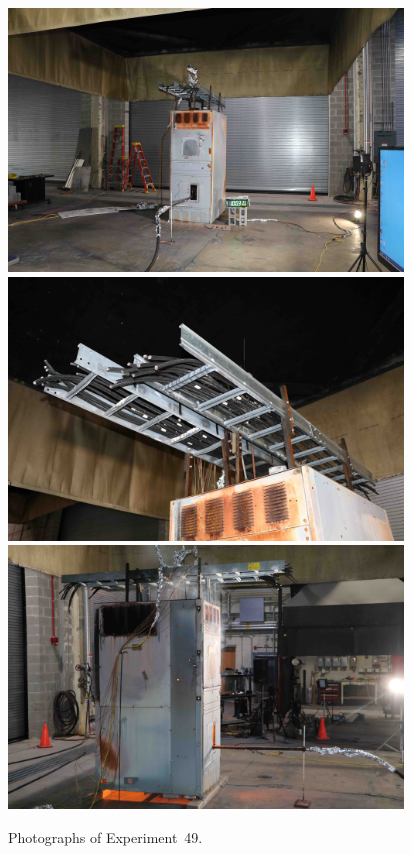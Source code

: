 \documentclass[12pt]{article}
\begin{document}
\begin{figure}[p]
\centering
\includegraphics[height=2.75in]{../FIGURES/Test_49_setup} \\
\includegraphics[height=2.75in]{../FIGURES/Test_49_cables} \\
\includegraphics[height=2.75in]{../FIGURES/Test_49_fire}
\caption[Photographs of Experiment~49]{Photographs of Experiment~49.}
\label{fig:Test_49_photos}
\end{figure}


\clearpage
\end{document}
